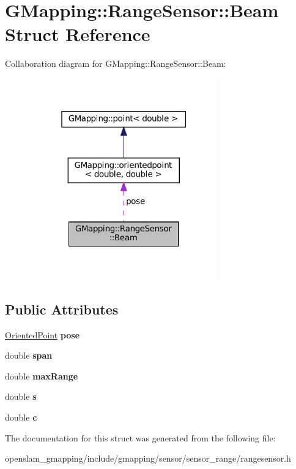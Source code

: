 \hypertarget{structGMapping_1_1RangeSensor_1_1Beam}{}\section{G\+Mapping\+:\+:Range\+Sensor\+:\+:Beam Struct Reference}
\label{structGMapping_1_1RangeSensor_1_1Beam}


Collaboration diagram for G\+Mapping\+:\+:Range\+Sensor\+:\+:Beam\+:
\nopagebreak
\begin{figure}[H]
\begin{center}
\leavevmode
\includegraphics[width=232pt]{structGMapping_1_1RangeSensor_1_1Beam__coll__graph}
\end{center}
\end{figure}
\subsection*{Public Attributes}
\begin{DoxyCompactItemize}
\item 
\mbox{\label{structGMapping_1_1RangeSensor_1_1Beam_af58edd45401569fad1901d1a80705ceb}} 
\hyperlink{structGMapping_1_1orientedpoint}{Oriented\+Point} {\bfseries pose}
\item 
\mbox{\label{structGMapping_1_1RangeSensor_1_1Beam_a35e06160bea66a036cdc6545c4df8716}} 
double {\bfseries span}
\item 
\mbox{\label{structGMapping_1_1RangeSensor_1_1Beam_ac37ac8ac6ac0878fca017efd633d264b}} 
double {\bfseries max\+Range}
\item 
\mbox{\label{structGMapping_1_1RangeSensor_1_1Beam_a2cb21ef187465442cd2e84ed00f89879}} 
double {\bfseries s}
\item 
\mbox{\label{structGMapping_1_1RangeSensor_1_1Beam_a5f79318479c1223e1d6122dd886bdddc}} 
double {\bfseries c}
\end{DoxyCompactItemize}


The documentation for this struct was generated from the following file\+:\begin{DoxyCompactItemize}
\item 
openslam\+\_\+gmapping/include/gmapping/sensor/sensor\+\_\+range/rangesensor.\+h\end{DoxyCompactItemize}
